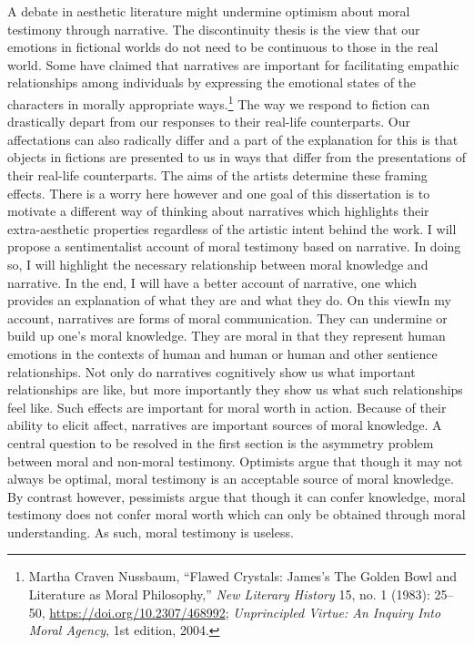 \documentclass[phdthesis,12pt,final]{wuthesis}
\theoremstyle{definition}
\theoremstyle{definition}
\theoremstyle{definition}
\theoremstyle{definition}
\theoremstyle{remark}
\begin{document}
A debate in aesthetic literature might undermine optimism about moral testimony through narrative. The discontinuity thesis is the view that our emotions in fictional worlds do not need to be continuous to those in the real world. Some have claimed that narratives are important for facilitating empathic relationships among individuals by expressing the emotional states of the characters in morally appropriate ways.\footnote{Martha Craven Nussbaum, {``Flawed {Crystals}: {James}'s {The Golden Bowl} and {Literature} as {Moral Philosophy},''} \emph{New Literary History} 15, no. 1 (1983): 25--50, \url{https://doi.org/10.2307/468992}; \emph{Unprincipled {Virtue}: {An Inquiry Into Moral Agency}}, 1st edition, 2004.} The way we respond to fiction can drastically depart from our responses to their real-life counterparts. Our affectations can also radically differ and a part of the explanation for this is that objects in fictions are presented to us in ways that differ from the presentations of their real-life counterparts. The aims of the artists determine these framing effects. There is a worry here however and one goal of this dissertation is to motivate a different way of thinking about narratives which highlights their extra-aesthetic properties regardless of the artistic intent behind the work. I will propose a sentimentalist account of moral testimony based on narrative. In doing so, I will highlight the necessary relationship between moral knowledge and narrative. In the end, I will have a better account of narrative, one which provides an explanation of what they are and what they do. On this viewIn my account, narratives are forms of moral communication. They can undermine or build up one's moral knowledge. They are moral in that they represent human emotions in the contexts of human and human or human and other sentience relationships. Not only do narratives cognitively show us what important relationships are like, but more importantly they show us what such relationships feel like. Such effects are important for moral worth in action. Because of their ability to elicit affect, narratives are important sources of moral knowledge. A central question to be resolved in the first section is the asymmetry problem between moral and non-moral testimony. Optimists argue that though it may not always be optimal, moral testimony is an acceptable source of moral knowledge. By contrast however, pessimists argue that though it can confer knowledge, moral testimony does not confer moral worth which can only be obtained through moral understanding. As such, moral testimony is useless.
\end{document}
